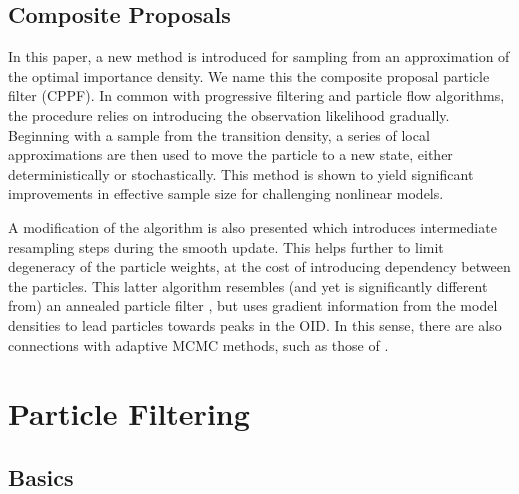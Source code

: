\documentclass{statsoc}
\begin{document}
\subsection{Composite Proposals}

In this paper, a new method is introduced for sampling from an approximation of the optimal importance density. We name this the composite proposal particle filter (CPPF). In common with progressive filtering and particle flow algorithms, the procedure relies on introducing the observation likelihood gradually. Beginning with a sample from the transition density, a series of local approximations are then used to move the particle to a new state, either deterministically or stochastically. This method is shown to yield significant improvements in effective sample size for challenging nonlinear models.

A modification of the algorithm is also presented which introduces intermediate resampling steps during the smooth update. This helps further to limit degeneracy of the particle weights, at the cost of introducing dependency between the particles. This latter algorithm resembles (and yet is significantly different from) an annealed particle filter \citep{Gall2007,Deutscher2000}, but uses gradient information from the model densities to lead particles towards peaks in the OID. In this sense, there are also connections with adaptive MCMC methods, such as those of \citep{Girolami2011}.



\section{Particle Filtering}

\subsection{Basics}
\end{document}
